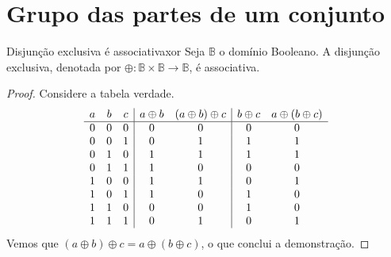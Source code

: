 \section{Grupo das partes de um conjunto}
\begin{lemma}{Disjunção exclusiva é associativa}{xor}
    Seja \(\mathbb{B}\) o domínio Booleano. A disjunção exclusiva, denotada por \(\oplus : \mathbb{B} \times \mathbb{B} \to \mathbb{B}\), é associativa.
\end{lemma}
\begin{proof}
    Considere a tabela verdade.
    \begin{equation*}
        \begin{array}{ c c c | c c | c c}
        a & b & c & a \oplus b & (a \oplus b)\oplus c & b \oplus c &  a \oplus (b \oplus c ) \\
         \hline
        0 & 0 & 0 & 0 & 0 & 0 & 0\\
        0 & 0 & 1 & 0 & 1 & 1 & 1\\
        0 & 1 & 0 & 1 & 1 & 1 & 1\\
        0 & 1 & 1 & 1 & 0 & 0 & 0\\
        1 & 0 & 0 & 1 & 1 & 0 & 1\\
        1 & 0 & 1 & 1 & 0 & 1 & 0\\
        1 & 1 & 0 & 0 & 0 & 1 & 0\\
        1 & 1 & 1 & 0 & 1 & 0 & 1
        \end{array}
    \end{equation*}
    Vemos que \((a \oplus b) \oplus c = a \oplus (b \oplus c)\), o que conclui a demonstração.
\end{proof}

